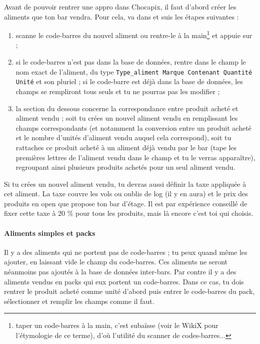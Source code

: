 \documentclass[12pt,french]{article}
\begin{document}
Avant de pouvoir rentrer une appro dans Chocapix, il faut d'abord créer les aliments que ton bar vendra. Pour cela, va dans  et suis les étapes suivantes :
\begin{enumerate}
	\item scanne le code-barres du nouvel aliment ou rentre-le à la main\footnote{taper un code-barres à la main, c'est subaïsse (voir le WikiX pour l'étymologie de ce terme), d'où l'utilité du scanner de codes-barres...} et appuie sur  ;
	\item si le code-barres n'est pas dans la base de données, rentre dans le champ  le nom exact de l'aliment, du type \texttt{Type\_aliment Marque Contenant Quantité Unité} et son pluriel ; si le code-barre est déjà dans la base de données, les champs se rempliront tous seuls et tu ne pourras pas les modifier ;
	\item la section du dessous concerne la correspondance entre produit acheté et aliment vendu ; soit tu crées un nouvel aliment vendu en remplissant les champs correspondants (et notamment la conversion entre un produit acheté et le nombre d'unités d'aliment vendu auquel cela correspond), soit tu rattaches ce produit acheté à un aliment déjà vendu par le bar (tape les premières lettres de l'aliment vendu dans le champ  et tu le verras apparaître), regroupant ainsi plusieurs produits achetés pour un seul aliment vendu.
\end{enumerate}
Si tu crées un nouvel aliment vendu, tu devras aussi définir la taxe appliquée à cet aliment. La taxe couvre les vols ou oublis de log (il y en aura) et le prix des produits en open que propose ton bar d'étage. Il est par expérience conseillé de fixer cette taxe à 20 \% pour tous les produits, mais là encore c'est toi qui choisis.

\paragraph{Aliments simples et packs} Il y a des aliments qui ne portent pas de code-barres ; tu peux quand même les ajouter, en laissant vide le champ du code-barres. Ces aliments ne seront néanmoins pas ajoutés à la base de données inter-bars. Par contre il y a des aliments vendus en packs qui eux portent un code-barres. Dans ce cas, tu dois rentrer le produit acheté comme unité d'abord puis entrer le code-barres du pack, sélectionner  et remplir les champs comme il faut.
\end{document}
